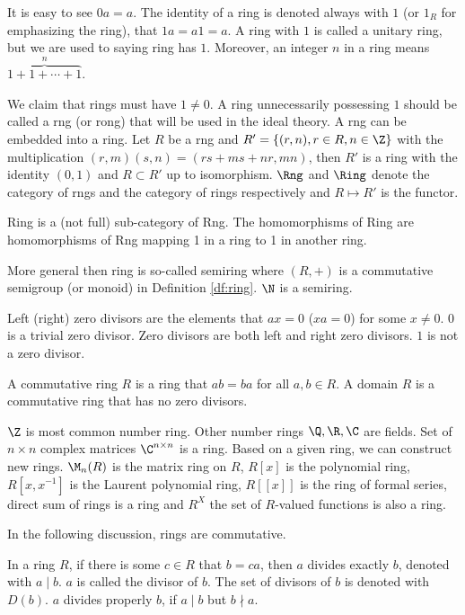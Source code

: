 \documentclass[11pt,a4paper,fleqn]{article}
\begin{document}
It is easy to see $0a=a$. The identity of a ring is denoted always with $1$ (or $1_R$ for emphasizing the ring), that $1a=a1=a$. A ring with $1$ is called a unitary ring, but we are used to saying ring has $1$. Moreover, an integer $n$ in a ring means $\overbrace{1+1+ \cdots +1}^n$.
\begin{remark}\label{rm:rng}We claim that rings must have $1\neq0$.
   A ring unnecessarily possessing $1$ should be called a rng (or rong) that will be used in the ideal theory. A rng can be embedded into a ring. Let $R$ be a rng and $R'=\{(r,n),r\in R,n\in\Z\}$ with the multiplication $(r,m)(s,n)=(rs+ms+nr,mn)$, then $R'$ is a ring with the identity $(0,1)$ and $R\subset R'$ up to isomorphism. $\Rng$ and $\Ring$ denote the category of rngs and the category of rings respectively and $R\mapsto R'$ is the functor.

   Ring is a (not full) sub-category of Rng. The homomorphisms of Ring are homomorphisms of Rng mapping 1 in a ring to 1 in another ring.
\end{remark}

\begin{remark}
  More general then ring is so-called semiring where $(R,+)$ is a commutative semigroup (or monoid) in Definition \ref{df:ring}. $\N$ is a semiring.
\end{remark}

Left (right) zero divisors are the elements that $ax = 0$ ($xa = 0$) for some $x\neq0$. $0$ is a trivial zero divisor. Zero divisors are both left and right zero divisors. $1$ is not a zero divisor.
\begin{definition} A commutative ring $R$ is a ring that $ab=ba$ for all $a,b\in R$. A domain $R$ is a commutative ring that has no zero divisors.
\end{definition}

\begin{example}
$\Z$ is most common number ring. Other number rings $\Q,\R,\C$ are fields. Set of $n\times n$ complex matrices $\C^{n\times n}$ is a ring.
Based on a given ring, we can construct new rings. $\M_n(R)$ is the matrix ring on $R$, $R[x]$ is the polynomial ring, $R[x,x^{-1}]$ is the Laurent polynomial ring, $R[[x]]$ is the ring of formal series, direct sum of rings is a ring and $R^X$ the set of $R$-valued functions is also a ring.
\end{example}

In the following discussion, rings are commutative.
\begin{definition} In a ring $R$, if there is some $c\in R$ that $b=ca$, then $a$ divides exactly $b$, denoted with $a\mid b$. $a$ is called the divisor of $b$. The set of divisors of $b$ is denoted with $D(b)$. $a$ divides properly $b$, if $a\mid b$ but $b\nmid a$.
\end{definition}
\end{document}
